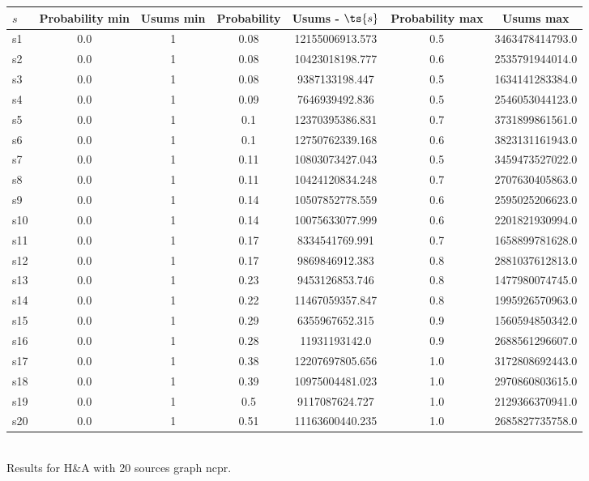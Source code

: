 \documentclass{article}
\begin{document}
\noindent\begin{tabular}{|l|c|c|c|c|c|c|}
\hline
$s$& Probability min & Usums min & Probability & Usums - $\ts{s}$ & Probability max & Usums max\\
\hline
s1 &0.0 & 1 & 0.08 & 12155006913.573 & 0.5 & 3463478414793.0\\
\hline
s2 &0.0 & 1 & 0.08 & 10423018198.777 & 0.6 & 2535791944014.0\\
\hline
s3 &0.0 & 1 & 0.08 & 9387133198.447 & 0.5 & 1634141283384.0\\
\hline
s4 &0.0 & 1 & 0.09 & 7646939492.836 & 0.5 & 2546053044123.0\\
\hline
s5 &0.0 & 1 & 0.1 & 12370395386.831 & 0.7 & 3731899861561.0\\
\hline
s6 &0.0 & 1 & 0.1 & 12750762339.168 & 0.6 & 3823131161943.0\\
\hline
s7 &0.0 & 1 & 0.11 & 10803073427.043 & 0.5 & 3459473527022.0\\
\hline
s8 &0.0 & 1 & 0.11 & 10424120834.248 & 0.7 & 2707630405863.0\\
\hline
s9 &0.0 & 1 & 0.14 & 10507852778.559 & 0.6 & 2595025206623.0\\
\hline
s10 &0.0 & 1 & 0.14 & 10075633077.999 & 0.6 & 2201821930994.0\\
\hline
s11 &0.0 & 1 & 0.17 & 8334541769.991 & 0.7 & 1658899781628.0\\
\hline
s12 &0.0 & 1 & 0.17 & 9869846912.383 & 0.8 & 2881037612813.0\\
\hline
s13 &0.0 & 1 & 0.23 & 9453126853.746 & 0.8 & 1477980074745.0\\
\hline
s14 &0.0 & 1 & 0.22 & 11467059357.847 & 0.8 & 1995926570963.0\\
\hline
s15 &0.0 & 1 & 0.29 & 6355967652.315 & 0.9 & 1560594850342.0\\
\hline
s16 &0.0 & 1 & 0.28 & 11931193142.0 & 0.9 & 2688561296607.0\\
\hline
s17 &0.0 & 1 & 0.38 & 12207697805.656 & 1.0 & 3172808692443.0\\
\hline
s18 &0.0 & 1 & 0.39 & 10975004481.023 & 1.0 & 2970860803615.0\\
\hline
s19 &0.0 & 1 & 0.5 & 9117087624.727 & 1.0 & 2129366370941.0\\
\hline
s20 &0.0 & 1 & 0.51 & 11163600440.235 & 1.0 & 2685827735758.0\\
\hline
\end{tabular}\\

\noindent Results for H\&A with 20 sources graph ncpr.
\end{document}
